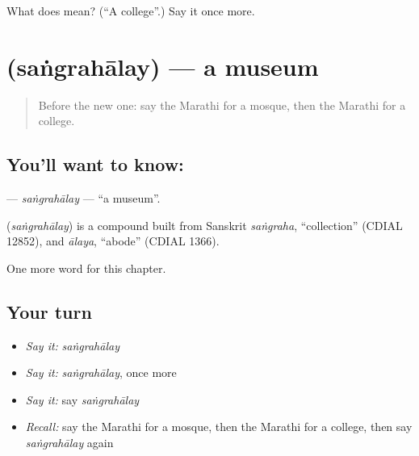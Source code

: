 \begin{tcolorbox}[breakable,colback=teal!4,colframe=teal!35!black,title={Before you move on}]
What does  mean? (\textquotedblleft{}A college\textquotedblright{}.) Say it once more.
\end{tcolorbox}
\section[\texorpdfstring{\mr{संग्रहालय} (saṅgrahālay)}{संग्रहालय (saṅgrahālay)}]{ (saṅgrahālay) — a museum}

\label{lesson:MR-C245-sangrahalay}



\begin{quote}
Before the new one: say the Marathi for a mosque, then the Marathi for a college.
\end{quote}

\subsection*{You'll want to know: }
\textbf{} — \emph{saṅgrahālay} — \textquotedblleft{}a museum\textquotedblright{}.

\begin{cousinweb}
\textbf{} (\emph{saṅgrahālay}) is a compound built from Sanskrit \emph{saṅgraha}, \textquotedblleft{}collection\textquotedblright{} (CDIAL 12852), and \emph{ālaya}, \textquotedblleft{}abode\textquotedblright{} (CDIAL 1366).
\end{cousinweb}

\begin{grammarlens}[title={What you've built}]
One more word for this chapter.
\end{grammarlens}

\subsection*{Your turn}
\begin{itemize}
\raggedright
  \item \emph{Say it:} \emph{saṅgrahālay}
  \item \emph{Say it:} \emph{saṅgrahālay}, once more
  \item \emph{Say it:} say \emph{saṅgrahālay}
  \item \emph{Recall:} say the Marathi for a mosque, then the Marathi for a college, then say \emph{saṅgrahālay} again
\end{itemize}

